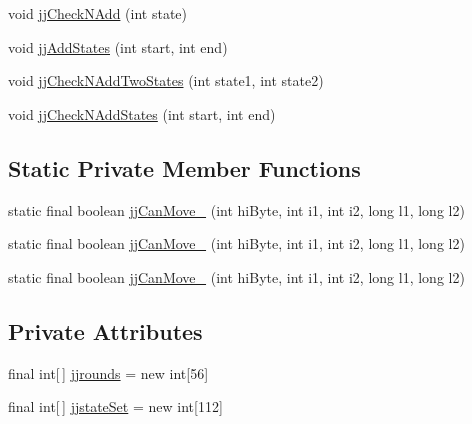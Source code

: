 \begin{DoxyCompactItemize}
\item 
void \hyperlink{classuk_1_1ac_1_1manchester_1_1cs_1_1owl_1_1owlapi_1_1turtle_1_1parser_1_1_turtle_parser_token_manager_a6df9be469ea4548873c36db6114797f1}{jj\-Check\-N\-Add} (int state)
\item 
void \hyperlink{classuk_1_1ac_1_1manchester_1_1cs_1_1owl_1_1owlapi_1_1turtle_1_1parser_1_1_turtle_parser_token_manager_a50d8bcaeccd894f72bd55aac56b58ce0}{jj\-Add\-States} (int start, int end)
\item 
void \hyperlink{classuk_1_1ac_1_1manchester_1_1cs_1_1owl_1_1owlapi_1_1turtle_1_1parser_1_1_turtle_parser_token_manager_a7b897f7d9bb1ea51703157cc4bf08bd5}{jj\-Check\-N\-Add\-Two\-States} (int state1, int state2)
\item 
void \hyperlink{classuk_1_1ac_1_1manchester_1_1cs_1_1owl_1_1owlapi_1_1turtle_1_1parser_1_1_turtle_parser_token_manager_a45694acf73aa1e0ad6c19695faa26354}{jj\-Check\-N\-Add\-States} (int start, int end)
\end{DoxyCompactItemize}
\subsection*{Static Private Member Functions}
\begin{DoxyCompactItemize}
\item 
static final boolean \hyperlink{classuk_1_1ac_1_1manchester_1_1cs_1_1owl_1_1owlapi_1_1turtle_1_1parser_1_1_turtle_parser_token_manager_a623fc6ae71b5cc8f2f872ac252e1263c}{jj\-Can\-Move\-\_} (int hi\-Byte, int i1, int i2, long l1, long l2)
\item 
static final boolean \hyperlink{classuk_1_1ac_1_1manchester_1_1cs_1_1owl_1_1owlapi_1_1turtle_1_1parser_1_1_turtle_parser_token_manager_a569c91d8d933ef875adc460e7e100f03}{jj\-Can\-Move\-\_} (int hi\-Byte, int i1, int i2, long l1, long l2)
\item 
static final boolean \hyperlink{classuk_1_1ac_1_1manchester_1_1cs_1_1owl_1_1owlapi_1_1turtle_1_1parser_1_1_turtle_parser_token_manager_ab122e3ddf95fa373711077d1575e8c8b}{jj\-Can\-Move\-\_} (int hi\-Byte, int i1, int i2, long l1, long l2)
\end{DoxyCompactItemize}
\subsection*{Private Attributes}
\begin{DoxyCompactItemize}
\item 
final int\mbox{[}$\,$\mbox{]} \hyperlink{classuk_1_1ac_1_1manchester_1_1cs_1_1owl_1_1owlapi_1_1turtle_1_1parser_1_1_turtle_parser_token_manager_aba3f4bb3f7854b9fce0c1b10f6c72066}{jjrounds} = new int\mbox{[}56\mbox{]}
\item 
final int\mbox{[}$\,$\mbox{]} \hyperlink{classuk_1_1ac_1_1manchester_1_1cs_1_1owl_1_1owlapi_1_1turtle_1_1parser_1_1_turtle_parser_token_manager_aefeebb705a67dea8dd1ed2b89ccef3cc}{jjstate\-Set} = new int\mbox{[}112\mbox{]}
\end{DoxyCompactItemize}


